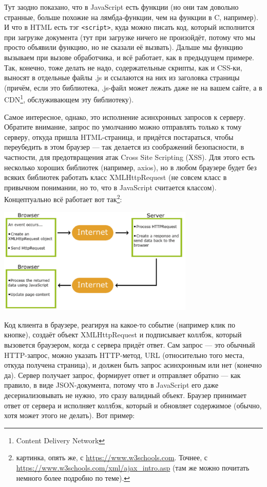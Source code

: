 \documentclass[a5paper]{article}
\begin{document}
Тут заодно показано, что в JavaScript есть функции (но они там довольно странные, больше похожие на лямбда-функции, чем на функции в C, например). И что в HTML есть тэг \texttt{<script>}, куда можно писать код, который исполнится при загрузке документа (тут при загрузке ничего не произойдёт, потому что мы просто объявили функцию, но не сказали её вызвать). Дальше мы функцию вызываем при вызове обработчика, и всё работает, как в предыдущем примере. Так, конечно, тоже делать не надо, содержательные скрипты, как и CSS-ки, выносят в отдельные файлы .js и ссылаются на них из заголовка страницы (причём, если это библиотека, .js-файл может лежать даже не на вашем сайте, а в CDN\footnote{Content Delivery Network}, обслуживающем эту библиотеку).

Самое интересное, однако, это исполнение асинхронных запросов к серверу. Обратите внимание, запрос по умолчанию можно отправлять только к тому серверу, откуда пришла HTML-страница, и придётся постараться, чтобы переубедить в этом браузер --- так делается из соображений безопасности, в частности, для предотвращения атак Cross Site Scripting (XSS). Для этого есть несколько хороших библиотек (например, axios), но в любом браузере будет без всяких библиотек работать класс XMLHttpRequest (не совсем класс в привычном понимании, но то, что в JavaScript считается классом). Концептуально всё работает вот так\footnote{картинка, опять же, с \url{https://www.w3schools.com}. Точнее, с \url{https://www.w3schools.com/xml/ajax_intro.asp} (там же можно почитать немного более подробно по теме).}:

\begin{center}
    \includegraphics[width=0.7\textwidth]{ajax.png}
\end{center}

Код клиента в браузере, реагируя на какое-то событие (например клик по кнопке), создаёт объект XMLHttpRequest и подписывает коллбэк, который вызовется браузером, когда с сервера придёт ответ. Сам запрос --- это обычный HTTP-запрос, можно указать HTTP-метод, URL (относительно того места, откуда получена страница), и должен быть запрос асинхронным или нет (конечно да). Сервер получает запрос, формирует ответ и отправляет обратно --- как правило, в виде JSON-документа, потому что в JavaScript его даже десериализовывать не нужно, это сразу валидный объект. Браузер принимает ответ от сервера и исполняет коллбэк, который и обновляет содержимое (обычно, хотя может этого не делать). Вот пример:
\end{document}

